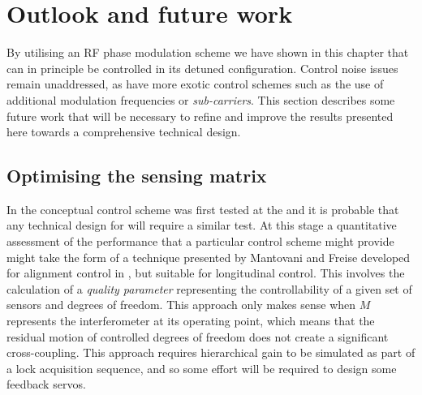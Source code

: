 \section{Outlook and future work}
By utilising an \gls{RF} phase modulation scheme we have shown in this chapter that \ETLF{} can in principle be controlled in its detuned configuration. Control noise issues remain unaddressed, as have more exotic control schemes such as the use of additional modulation frequencies or \emph{sub-carriers}. This section describes some future work that will be necessary to refine and improve the results presented here towards a comprehensive technical design.

\subsection{Optimising the sensing matrix}
In \ALIGO{} the conceptual control scheme was first tested at the \CALTECHFORTYM{} and it is probable that any technical design for \ETLF{} will require a similar test. At this stage a quantitative assessment of the performance that a particular control scheme might provide might take the form of a technique presented by Mantovani and Freise \cite{Mantovani2008} developed for alignment control in \VIRGO{}, but suitable for longitudinal control. This involves the calculation of a \emph{quality parameter} representing the controllability of a given set of sensors and degrees of freedom. This approach only makes sense when $M$ represents the interferometer at its operating point, which means that the residual motion of controlled degrees of freedom does not create a significant cross-coupling. This approach requires hierarchical gain to be simulated as part of a lock acquisition sequence, and so some effort will be required to design some feedback servos.

